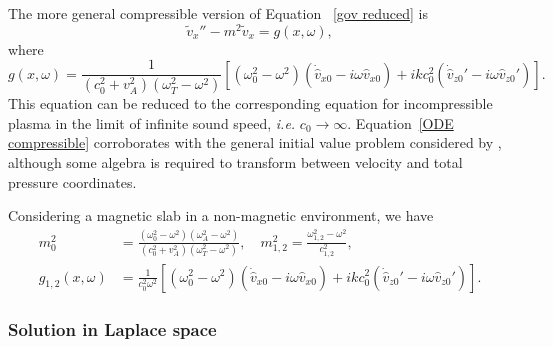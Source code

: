 The more general compressible version of Equation~ \eqref{gov reduced} is
\begin{equation}
\tilde{v}_x'' - m^2 \tilde{v}_x = g(x, \omega),
\end{equation}
where
\begin{equation}
g(x, \omega) = \frac{1}{(c_0^2 + v_A^2)(\omega_T^2 - \omega^2)}\left[ (\omega_0^2 - \omega^2)\left(\dot{\widehat{v}}_{x0} - i\omega \widehat{v}_{x0}\right) + ikc_0^2\left( \dot{\widehat{v}}_{z0}' - i\omega \widehat{v}_{z0}'\right) \right]. \label{ODE compressible}
\end{equation}
This equation can be reduced to the corresponding equation for incompressible plasma in the limit of infinite sound speed, \textit{i.e.} $c_0 \to \infty$.
Equation~\eqref{ODE compressible} corroborates with the general initial value problem considered by \cite{and_etal07}, although some algebra is required to transform between velocity and total pressure coordinates.

Considering a magnetic slab in a non-magnetic environment, we have
\begin{align}
m_0^2 &= \frac{(\omega_0^2 - \omega^2)(\omega_A^2 - \omega^2)}{(c_0^2 + v_A^2)(\omega_T^2 - \omega^2)}, \quad m_{1,2}^2 = \frac{\omega_{1,2}^2 - \omega^2}{c_{1,2}^2}, \\
g_{1,2}(x, \omega) &= \frac{1}{c_0^2\omega^2} \left[ (\omega_0^2 - \omega^2)\left(\dot{\widehat{v}}_{x0} - i\omega \widehat{v}_{x0}\right) + ikc_0^2\left( \dot{\widehat{v}}_{z0}' - i\omega \widehat{v}_{z0}'\right) \right].
\end{align}


\subsubsection{Solution in Laplace space}

